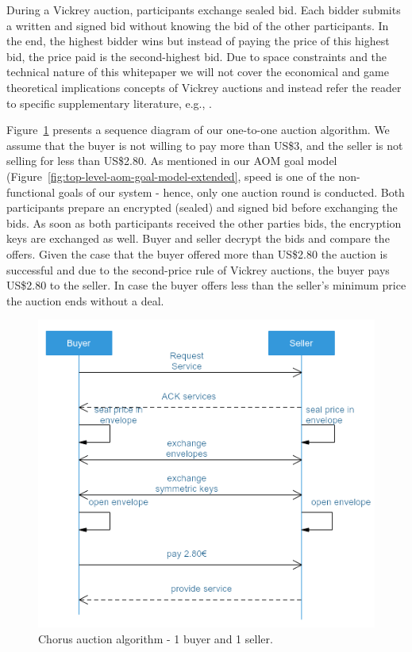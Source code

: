 \documentclass{llncs}
\begin{document}
{			During a Vickrey auction, participants exchange sealed bid. Each bidder submits a written and signed bid without knowing the bid of the other participants. In the end, the highest bidder wins but instead of paying the price of this highest bid, the price paid is the second-highest bid. Due to space constraints and the technical nature of this whitepaper we will not cover the economical and game theoretical implications concepts of Vickrey auctions and instead refer the reader to specific supplementary literature, e.g., \cite{ausubel2006lovely}\cite{edelman2007internet}\cite{lucking2000vickrey}\cite{moldovanu1998goethe}\cite{vickrey1961counterspeculation}.

			Figure~\ref{fig:auction-algorithm-1-1} presents a sequence diagram of our one-to-one auction algorithm. We assume that the buyer is not willing to pay more than US\$3, and the seller is not selling for less than US\$2.80. As mentioned in our AOM goal model (Figure~\ref{fig:top-level-aom-goal-model-extended}, speed is one of the non-functional goals of our system - hence, only one auction round is conducted.  Both participants prepare an encrypted (sealed) and signed bid before exchanging the bids. As soon as both participants received the other parties bids, the encryption keys are exchanged as well. Buyer and seller decrypt the bids and compare the offers. Given the case that the buyer offered more than US\$2.80 the auction is successful and due to the second-price rule of Vickrey auctions, the buyer pays US\$2.80 to the seller. In case the buyer offers less than the seller's minimum price the auction ends without a deal.
			
			\begin{figure}
				\centering
				\includegraphics[scale=0.5]{Figures/auction/20180501_auction-aglorithms--1-to-1.png}
				\caption{Chorus auction algorithm - 1 buyer and 1 seller.}	
				\label{fig:auction-algorithm-1-1}
			\end{figure}

}
\end{document}
